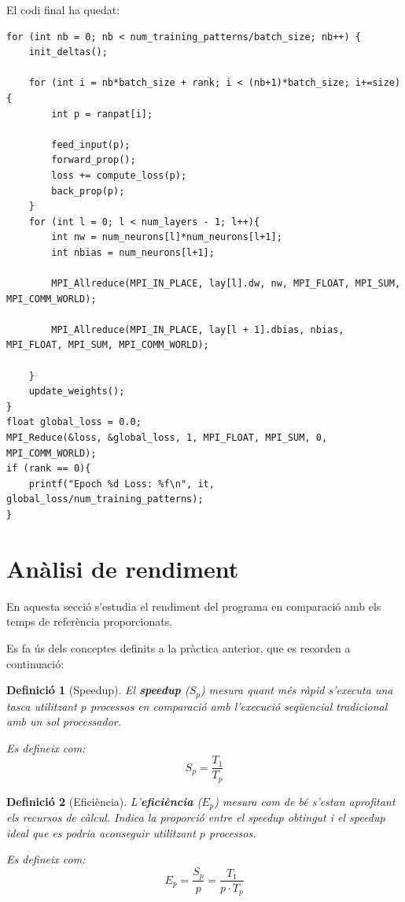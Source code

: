 \documentclass{article}
\newtheorem{defibox}{Definició}[section] %
\begin{document}
El codi final ha quedat:
\begin{lstlisting}
for (int nb = 0; nb < num_training_patterns/batch_size; nb++) {
    init_deltas();

    for (int i = nb*batch_size + rank; i < (nb+1)*batch_size; i+=size) {
        int p = ranpat[i];

        feed_input(p);
        forward_prop();
        loss += compute_loss(p);
        back_prop(p);
    }
    for (int l = 0; l < num_layers - 1; l++){
        int nw = num_neurons[l]*num_neurons[l+1];
        int nbias = num_neurons[l+1];

        MPI_Allreduce(MPI_IN_PLACE, lay[l].dw, nw, MPI_FLOAT, MPI_SUM, MPI_COMM_WORLD);

        MPI_Allreduce(MPI_IN_PLACE, lay[l + 1].dbias, nbias, MPI_FLOAT, MPI_SUM, MPI_COMM_WORLD);

    }
    update_weights();
}
float global_loss = 0.0;
MPI_Reduce(&loss, &global_loss, 1, MPI_FLOAT, MPI_SUM, 0, MPI_COMM_WORLD);
if (rank == 0){
    printf("Epoch %d Loss: %f\n", it, global_loss/num_training_patterns);
}
\end{lstlisting}

\newpage
\section{Anàlisi de rendiment}

En aquesta secció s'estudia el rendiment del programa en comparació amb els temps de referència proporcionats.

Es fa ús dels conceptes definits a la pràctica anterior, que es recorden a continuació:

\begin{defibox}[Speedup]
El \textbf{speedup} ($S_p$) mesura quant més ràpid s'executa una tasca utilitzant $p$ processos en comparació amb l'execució seqüencial tradicional amb un sol processador.

Es defineix com:
\[
S_p = \frac{T_1}{T_p}
\]
\end{defibox}

\begin{defibox}[Eficiència]
L'\textbf{eficiència} ($E_p$) mesura com de bé s'estan aprofitant els recursos de càlcul. Indica la proporció entre el speedup obtingut
i el speedup ideal que es podria aconseguir
utilitzant $p$ processos.

Es defineix com:
\[
E_p = \frac{S_p}{p} = \frac{T_1}{p\cdot T_p}
\]
\end{defibox}
\end{document}
